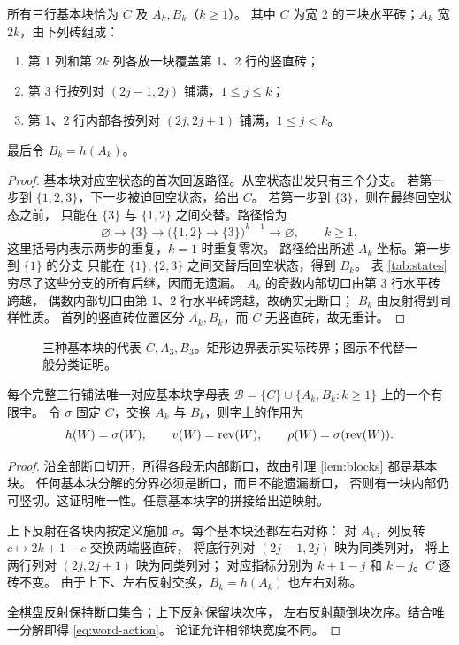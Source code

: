 \begin{lemma}[基本块分类]\label{lem:blocks}
所有三行基本块恰为 $C$ 及 $A_k,B_k$（$k\ge1$）。
其中 $C$ 为宽 2 的三块水平砖；$A_k$ 宽 $2k$，由下列砖组成：
\begin{enumerate}
\item 第 1 列和第 $2k$ 列各放一块覆盖第 1、2 行的竖直砖；
\item 第 3 行按列对 $(2j-1,2j)$ 铺满，$1\le j\le k$；
\item 第 1、2 行内部各按列对 $(2j,2j+1)$ 铺满，$1\le j<k$。
\end{enumerate}
最后令 $B_k=h(A_k)$。
\end{lemma}
\begin{proof}
基本块对应空状态的首次回返路径。从空状态出发只有三个分支。
若第一步到 $\{1,2,3\}$，下一步被迫回空状态，给出 $C$。
若第一步到 $\{3\}$，则在最终回空状态之前，
只能在 $\{3\}$ 与 $\{1,2\}$ 之间交替。路径恰为
\[
 \varnothing\longrightarrow\{3\}
 \longrightarrow
 \bigl(\{1,2\}\longrightarrow\{3\}\bigr)^{k-1}
 \longrightarrow\varnothing,\qquad k\ge1,
\]
这里括号内表示两步的重复，$k=1$ 时重复零次。
路径给出所述 $A_k$ 坐标。第一步到 $\{1\}$ 的分支
只能在 $\{1\},\{2,3\}$ 之间交替后回空状态，得到 $B_k$。
表 \ref{tab:states} 穷尽了这些分支的所有后继，因而无遗漏。
$A_k$ 的奇数内部切口由第 3 行水平砖跨越，
偶数内部切口由第 1、2 行水平砖跨越，故确实无断口；
$B_k$ 由反射得到同样性质。
首列的竖直砖位置区分 $A_k,B_k$，而 $C$ 无竖直砖，故无重计。
\end{proof}

\begin{figure}[htbp]
\centering

\caption{三种基本块的代表 $C,A_3,B_3$。矩形边界表示实际砖界；图示不代替一般分类证明。}
\label{fig:blocks}
\end{figure}

\begin{lemma}[唯一块分解及对称作用]\label{lem:word}
每个完整三行铺法唯一对应基本块字母表
$\mathcal B=\{C\}\cup\{A_k,B_k:k\ge1\}$ 上的一个有限字。
令 $\sigma$ 固定 $C$，交换 $A_k$ 与 $B_k$，则字上的作用为
\begin{equation}\label{eq:word-action}
 h(W)=\sigma(W),\qquad v(W)=\operatorname{rev}(W),\qquad
 \rho(W)=\sigma(\operatorname{rev}(W)).
\end{equation}
\end{lemma}
\begin{proof}
沿全部断口切开，所得各段无内部断口，故由引理 \ref{lem:blocks} 都是基本块。
任何基本块分解的分界必须是断口，而且不能遗漏断口，
否则有一块内部仍可竖切。这证明唯一性。任意基本块字的拼接给出逆映射。

上下反射在各块内按定义施加 $\sigma$。每个基本块还都左右对称：
对 $A_k$，列反转 $c\mapsto2k+1-c$ 交换两端竖直砖，
将底行列对 $(2j-1,2j)$ 映为同类列对，
将上两行列对 $(2j,2j+1)$ 映为同类列对；
对应指标分别为 $k+1-j$ 和 $k-j$。$C$ 逐砖不变。
由于上下、左右反射交换，$B_k=h(A_k)$ 也左右对称。

全棋盘反射保持断口集合；上下反射保留块次序，
左右反射颠倒块次序。结合唯一分解即得 \eqref{eq:word-action}。
论证允许相邻块宽度不同。
\end{proof}

